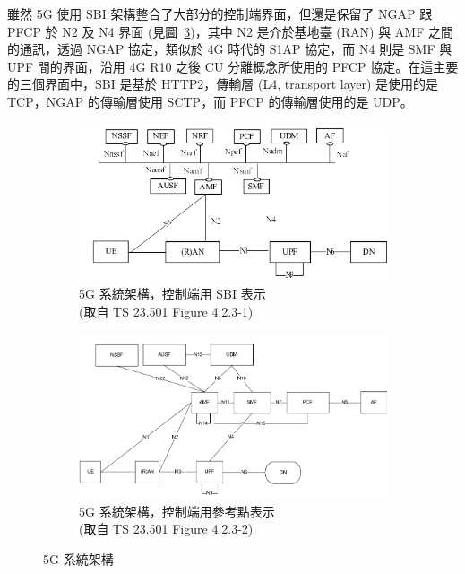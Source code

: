 雖然 5G 使用 SBI 架構整合了大部分的控制端界面，但還是保留了 NGAP 跟 PFCP 於 N2 及 N4 界面 (見圖~\ref{fig:5g_system_architecture})，其中 N2 是介於基地臺 (RAN) 與 AMF 之間的通訊，透過 NGAP 協定，類似於 4G 時代的 S1AP 協定，而 N4 則是 SMF 與 UPF 間的界面，沿用 4G R10 之後 CU 分離概念所使用的 PFCP 協定。在這主要的三個界面中，SBI 是基於 HTTP2，傳輸層 (L4, transport layer) 是使用的是 TCP，NGAP 的傳輸層使用 SCTP，而 PFCP 的傳輸層使用的是 UDP。

\begin{figure}[ht]
    \centering
    \captionsetup{justification=centering}
    \begin{subfigure}[b]{.5\linewidth}
        \centering
        \includegraphics[height=!,width=0.95\linewidth,keepaspectratio=true]{figures/23_501_4-2-3-1_sys_arch_sbi}
        \caption[5G 系統架構，控制端用 SBI 表示]{{5G 系統架構，控制端用 SBI 表示\\\scriptsize (取自 TS 23.501 Figure 4.2.3-1)}}
        \label{fig:5g_system_architecture_sbi}
    \end{subfigure}%
    \begin{subfigure}[b]{.5\linewidth}
        \centering
        \includegraphics[height=!,width=0.95\linewidth,keepaspectratio=true]{figures/23_501_4-2-3-2_sys_arch_ref}
        \caption[5G 系統架構，控制端用參考點表示]{{5G 系統架構，控制端用參考點表示\\\scriptsize (取自 TS 23.501 Figure 4.2.3-2)}}
        \label{fig:5g_system_architecture_interface}
    \end{subfigure}
    \caption[5G 系統架構]{{\footnotesize 5G 系統架構~\cite{3gpp.23.501}}}
    \label{fig:5g_system_architecture}
\end{figure}

